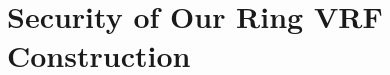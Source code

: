 \newcommand{\name}{rVRF}
\section{Security of Our Ring VRF Construction} 
\label{ap:ucproof}
\label{sec:ringvrfconstrnoPK}
\newcommand{\GG}{\grE}
\newcommand{\FF}{\F}
\newcommand{\hash}{H}
\newcommand{\hashG}{\hash_\grE}
\newcommand{\gen}{\mathsf{Gen}}
\newcommand{\hkeys}{\mathtt{h\_keys}}
\newcommand{\malkeys}{\mathtt{m\_keys}}
\newcommand{\rcom}{\mathcal{R}_{eval}}
\newcommand{\rsnark}{\Rring}
\newcommand{\counter}{\mathsf{counter}}
\newcommand{\bdv}{\mathcal{B}}
\newcommand{\abort}{\textsc{Abort}}
\newcommand{\pkeys}{\arraysym{public\_keys}}
\newcommand{\skeys}{\arraysym{secret\_keys}}
\newcommand{\keytransform}{T_{\mathsf{key}}}
%
%
%	
%	
%	
%	
%
%		
